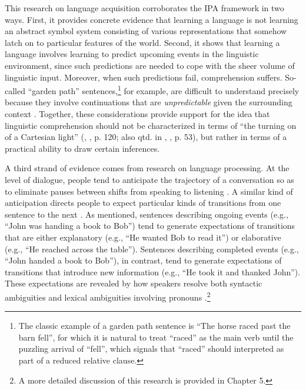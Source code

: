 This research on language acquisition corroborates the IPA framework in two ways. First, it provides concrete evidence that learning a language is not learning an abstract symbol system consisting of various representations that somehow latch on to particular features of the world. Second, it shows that learning a language involves learning to predict upcoming events in the linguistic environment, since such predictions are needed to cope with the sheer volume of linguistic input. Moreover, when such predictions fail, comprehension suffers. So-called ``garden path'' sentences,\footnote{The classic example of a garden path sentence is ``The horse raced past the barn fell'', for which it is natural to treat ``raced'' as the main verb until the puzzling arrival of ``fell'', which signals that ``raced'' should interpreted as part of a reduced relative clause.} for example, are difficult to understand precisely because they involve continuations that are \textit{unpredictable} given the surrounding context \citep{Christiansen:2015}. Together, these considerations provide support for the idea that linguistic comprehension should not be characterized in terms of ``the turning on of a Cartesian light'' (\citeauthor{Brandom:1994}, \citeyear{Brandom:1994}, p. 120; also qtd. in \citeauthor{Dennett:2010}, \citeyear{Dennett:2010}, p. 53), but rather in terms of a practical ability to draw certain inferences.

A third strand of evidence comes from research on language processing. At the level of dialogue, people tend to anticipate the trajectory of a conversation so as to eliminate pauses between shifts from speaking to listening \citep{Christiansen:2015,Pickering:2013}. A similar kind of anticipation directs people to expect particular kinds of transitions from one sentence to the next \citep{Rohde:2008}. As mentioned, sentences describing ongoing events (e.g., ``John was handing a book to Bob'') tend to generate expectations of transitions that are either explanatory (e.g., ``He wanted Bob to read it'') or elaborative (e.g., ``He reached across the table''). Sentences describing completed events (e.g., ``John handed a book to Bob''), in contrast, tend to generate expectations of transitions that introduce new information (e.g., ``He took it and thanked John''). These expectations are revealed by how speakers resolve both syntactic ambiguities and lexical ambiguities involving pronouns \citep{Rohde:2008}.\footnote{A more detailed discussion of this research is provided in Chapter 5.}

